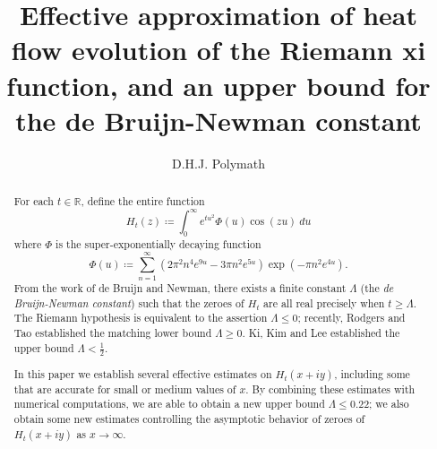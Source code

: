 \documentclass[a4paper,11pt,twoside]{amsart}
\newcommand\R{\mathbb{R}}
\begin{document}
\title[Upper bound for de Bruijn-Newman constant]{Effective approximation of heat flow evolution of the Riemann xi function, and an upper bound for the de Bruijn-Newman constant}

\author{D.H.J. Polymath}
\address{\tt{http://michaelnielsen.org/polymath1/index.php}}


\begin{abstract}
For each $t \in \R$, define the entire function
$$ H_t(z) \coloneqq \int_0^\infty e^{tu^2} \Phi(u) \cos(zu)\ du$$
where $\Phi$ is the super-exponentially decaying function
$$ \Phi(u) \coloneqq \sum_{n=1}^\infty (2\pi^2  n^4 e^{9u} - 3\pi n^2 e^{5u} ) \exp(-\pi n^2 e^{4u} ).$$
From the work of de Bruijn and Newman, there exists a finite constant $\Lambda$ (the \emph{de Bruijn-Newman constant}) such that the zeroes of $H_t$ are all real precisely when $t \geq \Lambda$.  The Riemann hypothesis is equivalent to the assertion $\Lambda \leq 0$; recently, Rodgers and Tao established the matching lower bound $\Lambda \geq 0$.  Ki, Kim and Lee established the upper bound $\Lambda < \frac{1}{2}$.

In this paper we establish several effective estimates on $H_t(x+iy)$, including some that are accurate for small or medium values of $x$.  By combining these estimates with numerical computations, we are able to obtain a new upper bound $\Lambda \leq 0.22$; we also obtain some new estimates controlling the asymptotic behavior of zeroes of $H_t(x+iy)$ as $x \to \infty$.
\end{abstract}


\maketitle











\end{document}
